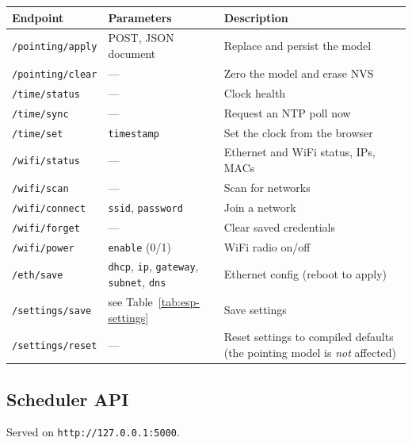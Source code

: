 \documentclass[11pt,a4paper]{article}
\begin{document}
\footnotesize
\begin{longtable}{lp{4.0cm}p{5.4cm}}
\toprule
\textbf{Endpoint} & \textbf{Parameters} & \textbf{Description} \\
\midrule
\endhead
\texttt{/pointing/apply} & POST, JSON document & Replace and persist the model \\
\texttt{/pointing/clear} & --- & Zero the model and erase NVS \\
\texttt{/time/status} & --- & Clock health \\
\texttt{/time/sync} & --- & Request an NTP poll now \\
\texttt{/time/set} & \texttt{timestamp} & Set the clock from the browser \\
\texttt{/wifi/status} & --- & Ethernet and WiFi status, IPs, MACs \\
\texttt{/wifi/scan} & --- & Scan for networks \\
\texttt{/wifi/connect} & \texttt{ssid}, \texttt{password} & Join a network \\
\texttt{/wifi/forget} & --- & Clear saved credentials \\
\texttt{/wifi/power} & \texttt{enable} (0/1) & WiFi radio on/off \\
\texttt{/eth/save} & \texttt{dhcp}, \texttt{ip}, \texttt{gateway}, \texttt{subnet}, \texttt{dns} & Ethernet config (reboot to apply) \\
\texttt{/settings/save} & see Table~\ref{tab:esp-settings} & Save settings \\
\texttt{/settings/reset} & --- & Reset settings to compiled defaults (the pointing model is \emph{not} affected) \\
\bottomrule
\end{longtable}

\subsection{Scheduler API}

Served on \texttt{http://127.0.0.1:5000}.
\end{document}
